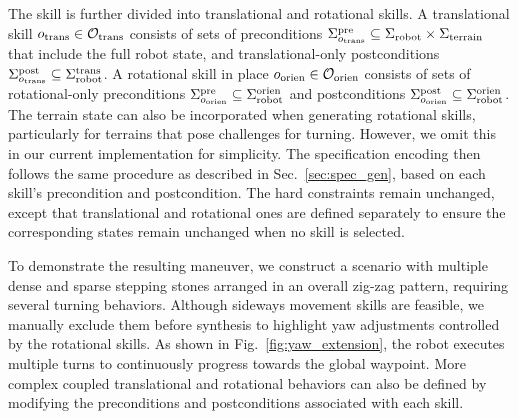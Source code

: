 The skill is further divided into translational and rotational skills. A translational skill $o_{\textrm{trans}} \in {\mathcal O}_{\textrm{trans}}$
consists of 
sets of preconditions $\Sigma_{o_{\textrm{trans}}}^{\textrm{pre}} \subseteq \Sigma_{\textrm{robot}} \times \Sigma_{\textrm{terrain}}$ that include the full robot state, and 
translational-only postconditions $\Sigma_{o_{\textrm{trans}}}^{\textrm{post}} \subseteq \Sigma_{\textrm{robot}}^{\textrm{trans}}$. A rotational skill in place $o_{\textrm{orien}} \in {\mathcal O}_{\textrm{orien}}$ consists of sets of rotational-only preconditions $\Sigma_{o_{\textrm{orien}}}^{\textrm{pre}} \subseteq \Sigma_{\textrm{robot}}^{\textrm{orien}}$ and postconditions $\Sigma_{o_{\textrm{orien}}}^{\textrm{post}} \subseteq \Sigma_{\textrm{robot}}^{\textrm{orien}}$. The terrain state can also be incorporated when generating rotational skills, particularly for terrains that pose challenges for turning. However, we omit this in our current implementation for simplicity. The specification encoding then follows the same procedure as described in Sec.~\ref{sec:spec_gen}, based on each skill's precondition and postcondition. The hard constraints remain unchanged, except that translational and rotational ones are defined separately to ensure the corresponding states remain unchanged when no skill is selected.

To demonstrate the resulting maneuver, we construct a scenario with multiple dense and sparse stepping stones arranged in an overall zig-zag pattern, requiring several turning behaviors. Although sideways movement skills are feasible, we manually exclude them before synthesis to highlight yaw adjustments controlled by the rotational skills. As shown in Fig.~\ref{fig:yaw_extension}, the robot executes multiple turns to continuously progress towards the global waypoint. More complex coupled translational and rotational behaviors can also be defined by modifying the preconditions and postconditions associated with each skill.



